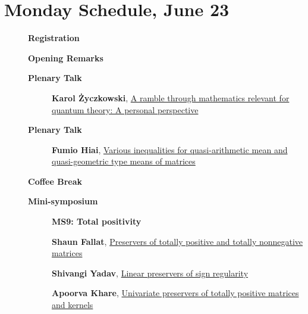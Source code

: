 \documentclass[ILAS2025-program.tex]{subfiles}
\begin{document}
\section{Monday Schedule, June 23}
    
    \begin{description}
    \item[] \textbf{Registration} 
    \item[] \textbf{Opening Remarks} 
    \item[] \textbf{Plenary Talk} 
    \begin{description}
        \item[] \hypertarget{up0000}{}\textbf{Karol Życzkowski}, \hyperlink{down0000}{A ramble through mathematics relevant for quantum theory:  A personal perspective
}
        \end{description}
        \item[] \textbf{Plenary Talk} 
    \begin{description}
        \item[] \hypertarget{up0001}{}\textbf{Fumio Hiai}, \hyperlink{down0001}{Various inequalities for quasi-arithmetic mean and quasi-geometric type means of matrices}
        \end{description}
        \item[] \textbf{Coffee Break} 
    \item[] \textbf{Mini-symposium} 
    \begin{description}
    \item[] {\color{mstitle}\textbf{MS9: Total positivity}} 
    \item[] \hypertarget{up0010}{}\textbf{Shaun Fallat}, \hyperlink{down0010}{Preservers of totally positive and totally nonnegative matrices}
        \item[] \hypertarget{up0011}{}\textbf{Shivangi Yadav}, \hyperlink{down0011}{Linear preservers of sign regularity}
        \item[] \hypertarget{up0012}{}\textbf{Apoorva Khare}, \hyperlink{down0012}{Univariate preservers of totally positive matrices and kernels
}
        \end{description}
    \begin{description}

\end{description}
\end{description}
\end{document}

